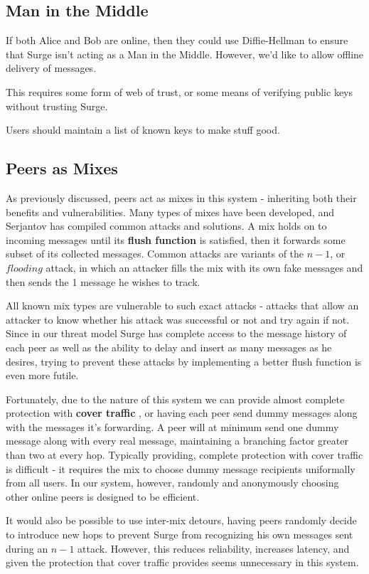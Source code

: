 \documentclass[twocolumn,11pt,english]{paper}
\begin{document}
\subsection{Man in the Middle} If both Alice and Bob are online, then they could use Diffie-Hellman to ensure that Surge isn't acting as a Man in the Middle. However, we'd like to allow offline delivery of messages.

This requires some form of web of trust, or some means of verifying public keys without trusting Surge. 

Users should maintain a list of known keys to make stuff good. 

\subsection{Peers as Mixes}
As previously discussed, peers act as mixes in this system - inheriting both their benefits and vulnerabilities. Many types of mixes have been developed, and Serjantov \cite{trickle02} has compiled common attacks and solutions. 
A mix holds on to incoming messages until its \textbf{flush function} is satisfied, then it forwards some subset of its collected messages. Common attacks are variants of the $n - 1$, or $flooding$ attack, in which an attacker fills the mix with its own fake messages and then sends the 1 message he wishes to track. 

All known mix types are vulnerable to such exact attacks \cite{trickle02} -  attacks that allow an attacker to know whether his attack was successful or not and try again if not. Since in our threat model Surge has complete access to the message history of each peer as well as the ability to delay and insert as many messages as he desires, trying to prevent these attacks by implementing a better flush function is even more futile. 

Fortunately, due to the nature of this system we can provide almost complete protection with \textbf{cover traffic} \cite{trickle02}, or having each peer send dummy messages along with the messages it's forwarding. A peer will at minimum send one dummy message along with every real message, maintaining a branching factor greater than two at every hop. Typically providing, complete protection with cover traffic is difficult - it requires the mix to choose dummy message recipients uniformally from all users. In our system, however, randomly and anonymously choosing other online peers is designed to be efficient.

It would also be possible to use inter-mix detours\cite{TODO}, having peers randomly decide to introduce new hops to prevent Surge from recognizing his own messages sent during an $n - 1$ attack. However, this reduces reliability, increases latency, and given the protection that cover traffic provides seems unnecessary in this system. 
\end{document}
